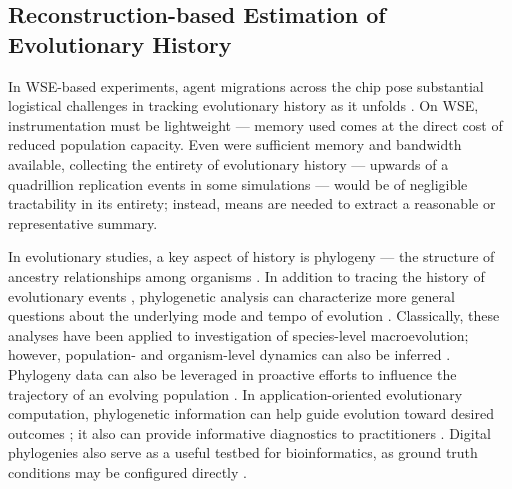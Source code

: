 \subsection{Reconstruction-based Estimation of Evolutionary History}
\label{moreno:sec:case2:hstrat}

In WSE-based experiments, agent migrations across the chip pose substantial logistical challenges in tracking evolutionary history as it unfolds \cite{moreno2024analysis}.
On WSE, instrumentation must be lightweight --- memory used comes at the direct cost of reduced population capacity.
Even were sufficient memory and bandwidth available, collecting the entirety of evolutionary history --- upwards of a quadrillion replication events in some simulations \cite{singhvi2025scalable} --- would be of negligible tractability in its entirety; instead, means are needed to extract a reasonable or representative summary.

In evolutionary studies, a key aspect of history is phylogeny --- the structure of ancestry relationships among organisms \cite{faithConservationEvaluationPhylogenetic1992, STAMATAKIS2005phylogenetics,frenchHostPhylogenyShapes2023,kim2006discovery,lenski2003evolutionary}.
In addition to tracing the history of evolutionary events \cite{dawkins2016ancestor,hedges2015tree,hinchliff2015synthesis}, phylogenetic analysis can characterize more general questions about the underlying mode and tempo of evolution \cite{felsenstein1985phylogenies}.
Classically, these analyses have been applied to investigation of species-level macroevolution; however, population- and organism-level dynamics can also be inferred \cite{genthon2023cell, levy2015quantitative,stadler2013recovering,Moreno2025ecology,lewinsohnStatedependentEvolutionaryModels2023a,nozoe2017inferring}.
Phylogeny data can also be leveraged in proactive efforts to influence the trajectory of an evolving population \cite{Scott2018}.
In application-oriented evolutionary computation, phylogenetic information can help guide evolution toward desired outcomes \cite{lalejini2024phylogeny,lalejini2024runtime,murphy2008simple,burke2003increased}; it also can provide informative diagnostics to practitioners \cite{hernandez2022can,shahbandegan2022untangling}.
Digital phylogenies also serve as a useful testbed for bioinformatics, as ground truth conditions may be configured directly \cite{daudey2024aevol,haller2023slim,moreno2025extending}.

